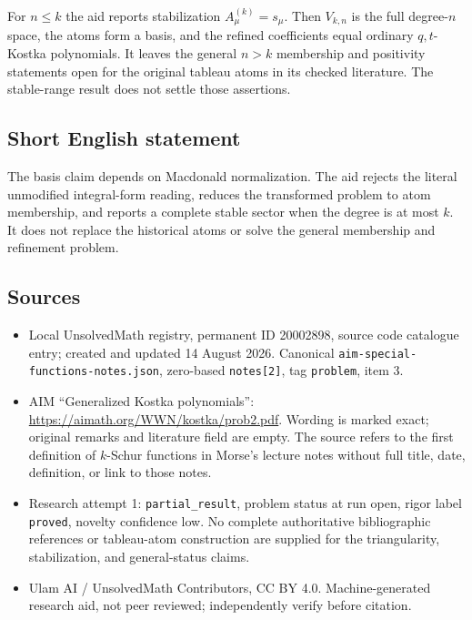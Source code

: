\documentclass[11pt]{article}
\begin{document}
For $n\le k$ the aid reports stabilization $A_\mu^{(k)}=s_\mu$. Then $V_{k,n}$ is the full degree-$n$ space, the atoms form a basis, and the refined coefficients equal ordinary $q,t$-Kostka polynomials. It leaves the general $n>k$ membership and positivity statements open for the original tableau atoms in its checked literature. The stable-range result does not settle those assertions.
\subsection{Short English statement}
The basis claim depends on Macdonald normalization. The aid rejects the literal unmodified integral-form reading, reduces the transformed problem to atom membership, and reports a complete stable sector when the degree is at most $k$. It does not replace the historical atoms or solve the general membership and refinement problem.
\subsection{Sources}
\begin{itemize}
\item Local UnsolvedMath registry, permanent ID 20002898, source code catalogue entry; created and updated 14 August 2026. Canonical \texttt{aim-special-functions-notes.json}, zero-based \texttt{notes[2]}, tag \texttt{problem}, item 3.
\item AIM ``Generalized Kostka polynomials'': \url{https://aimath.org/WWN/kostka/prob2.pdf}. Wording is marked exact; original remarks and literature field are empty. The source refers to the first definition of $k$-Schur functions in Morse's lecture notes without full title, date, definition, or link to those notes.
\item Research attempt 1: \texttt{partial\_result}, problem status at run open, rigor label \texttt{proved}, novelty confidence low. No complete authoritative bibliographic references or tableau-atom construction are supplied for the triangularity, stabilization, and general-status claims.
\item Ulam AI / UnsolvedMath Contributors, CC BY 4.0. Machine-generated research aid, not peer reviewed; independently verify before citation.
\end{itemize}
\end{document}
